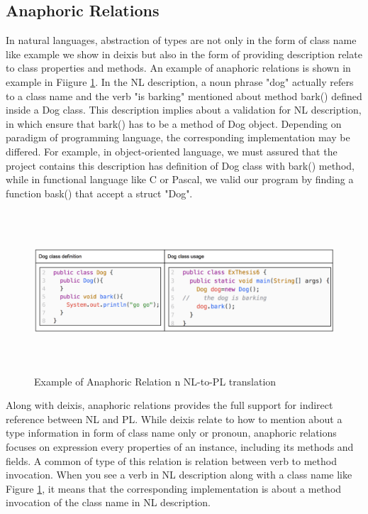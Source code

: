\subsection{Anaphoric Relations}
In natural languages, abstraction of types are not only in the form of class name like example we show in deixis but also in the form of providing description relate to class properties and methods. An example of anaphoric relations is  shown in example in Fiigure \ref{fig:AnaphoricExample}. In the NL description, a noun phrase "dog" actually refers to a class name and the verb "is barking" mentioned about method bark() defined inside a Dog class. This description implies about a validation for NL description, in which ensure that bark() has to be a method of Dog object. Depending on paradigm of programming language, the corresponding implementation may be differed. For example, in object-oriented language, we must assured that the project contains this description has definition of Dog class with bark() method, while in functional language like C or Pascal, we valid our program by finding a function bask() that accept a struct "Dog". \\

\begin{figure}[htp]
	\centering
	\includegraphics[width=18cm,height=6cm]{resources/fig_anaphoric_example.png}%
	\caption[Example of Anaphoric Relation in NL-to-PL translation]{Example of Anaphoric Relation n NL-to-PL translation} 
	\label{fig:AnaphoricExample}
\end{figure}


Along with deixis, anaphoric relations provides the full support for indirect reference between NL and PL. While deixis relate to how to mention about a type information in form of class name only or pronoun, anaphoric relations focuses on expression every properties of an instance, including its methods and fields. A common of type of this relation is relation between verb to method invocation. When you see a verb in NL description along with a class name like Figure \ref{fig:AnaphoricExample}, it means that the corresponding implementation is about a method invocation of the class name in NL description.
 
